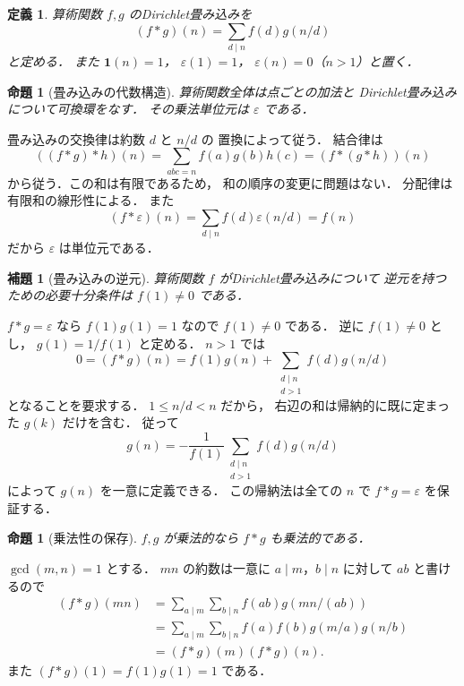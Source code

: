 \documentclass[a5paper,10pt,onecolumn]{jsarticle}
\makeatletter
\theoremstyle{mathnotetheorem}
\newtheorem{definition}[theorem]{定義}
\newtheorem{lemma}[theorem]{補題}
\newtheorem{proposition}[theorem]{命題}
\renewcommand{\proofname}{証明}
\renewenvironment{proof}[1][\proofname]{%
  \par\pushQED{\qed}\normalfont\topsep4\p@\@plus2\p@\relax
  \trivlist\item[\hskip\labelsep\bfseries #1]\ignorespaces
}{\popQED\endtrivlist\@endpefalse}
\makeatother
\begin{document}
\begin{definition}
算術関数 $f,g$ の\emph{Dirichlet畳み込み}を
\[
 (f*g)(n)=\sum_{d\mid n}f(d)g(n/d)
\]
と定める．
また
$\mathbf1(n)=1$，
$\varepsilon(1)=1$，
$\varepsilon(n)=0$（$n>1$）と置く．
\end{definition}

\begin{proposition}[畳み込みの代数構造]\label{prop:convolution-ring}
算術関数全体は点ごとの加法と
Dirichlet畳み込みについて可換環をなす．
その乗法単位元は $\varepsilon$ である．
\end{proposition}
\begin{proof}
畳み込みの交換律は約数 $d$ と $n/d$ の
置換によって従う．
結合律は
\[
 ((f*g)*h)(n)=\sum_{abc=n}f(a)g(b)h(c)
 =(f*(g*h))(n)
\]
から従う．この和は有限であるため，
和の順序の変更に問題はない．
分配律は有限和の線形性による．
また
\[
 (f*\varepsilon)(n)
 =\sum_{d\mid n}f(d)\varepsilon(n/d)=f(n)
\]
だから $\varepsilon$ は単位元である．
\end{proof}

\begin{lemma}[畳み込みの逆元]\label{lem:unit}
算術関数 $f$ がDirichlet畳み込みについて
逆元を持つための必要十分条件は $f(1)\ne0$ である．
\end{lemma}
\begin{proof}
$f*g=\varepsilon$ なら
$f(1)g(1)=1$ なので $f(1)\ne0$ である．
逆に $f(1)\ne0$ とし，
$g(1)=1/f(1)$ と定める．
$n>1$ では
\[
 0=(f*g)(n)
 =f(1)g(n)+\sum_{\substack{d\mid n\\d>1}}
 f(d)g(n/d)
\]
となることを要求する．
$1\le n/d<n$ だから，
右辺の和は帰納的に既に定まった $g(k)$ だけを含む．
従って
\[
 g(n)=-\frac1{f(1)}
 \sum_{\substack{d\mid n\\d>1}}f(d)g(n/d)
\]
によって $g(n)$ を一意に定義できる．
この帰納法は全ての $n$ で
$f*g=\varepsilon$ を保証する．
\end{proof}

\begin{proposition}[乗法性の保存]\label{prop:multiplicative}
$f,g$ が乗法的なら $f*g$ も乗法的である．
\end{proposition}
\begin{proof}
$\gcd(m,n)=1$ とする．
$mn$ の約数は一意に $a\mid m$，$b\mid n$ に対して
$ab$ と書けるので
\begin{align*}
 (f*g)(mn)
 &=\sum_{a\mid m}\sum_{b\mid n}
 f(ab)g(mn/(ab))\\
 &=\sum_{a\mid m}\sum_{b\mid n}
 f(a)f(b)g(m/a)g(n/b)\\
 &=(f*g)(m)(f*g)(n).
\end{align*}
また $(f*g)(1)=f(1)g(1)=1$ である．
\end{proof}
\end{document}
